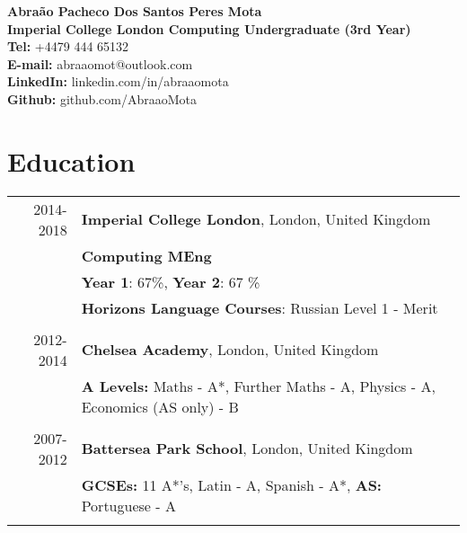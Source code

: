 \documentclass[a4paper,10pt]{article}
\begin{document}
	
	\begin{center}
		{\LARGE\bfseries Abra\~ao Pacheco Dos Santos Peres Mota} \\
		\vspace{2mm}
		{\textbf{Imperial College London Computing Undergraduate (3rd Year)} } \vspace{1mm} \\
		{\textbf{Tel:} +4479 444 65132} \\ \vspace{1mm}
		{\textbf{E-mail:} abraaomot@outlook.com } \\ \vspace{1mm}
		{\textbf{LinkedIn:} linkedin.com/in/abraaomota } \\ \vspace{1mm}
		{\textbf{Github:} github.com/AbraaoMota } \\
	
	\end{center}
	
	\section*{Education}
	
	\begin{tabular}{rl}	
		2014-2018 & \textbf{Imperial College London}, London, United Kingdom \\& 
		\textbf{Computing MEng}\\&
		\textbf{Year 1}: 67\%,
		\textbf{Year 2}: 67 \% \\&
		\textbf{Horizons Language Courses}: Russian Level 1 - Merit

		 \\\multicolumn{2}{c}{} \\
		
		2012-2014 & \textbf{Chelsea Academy}, London, United Kingdom \\&
		\textbf{A Levels:}
		Maths - A*, Further Maths - A, Physics - A, Economics (AS only) - B 
		\\\multicolumn{2}{c}{} \\
		
		2007-2012 & \textbf{Battersea Park School}, London, United Kingdom \\& 
		\textbf{GCSEs:} 11 A*'s, Latin - A, Spanish - A*, \textbf{AS:} Portuguese - A
		\\\multicolumn{2}{c}{} \\
	
	\end{tabular}
	
\end{document}
